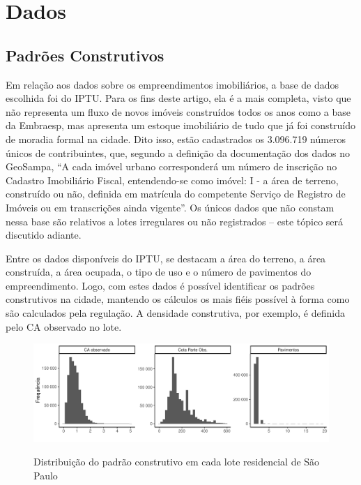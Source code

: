 \chapter{Dados}
\label{chp:dados}

\section{Padrões Construtivos}
\label{sec:dadosIPTU}

Em relação aos dados sobre os empreendimentos imobiliários, a base de dados escolhida foi do IPTU. Para os fins deste artigo, ela é a mais completa, visto que não representa um fluxo de novos imóveis construídos todos os anos como a base da Embraesp, mas apresenta um estoque imobiliário de tudo que já foi construído de moradia formal na cidade. Dito isso, estão cadastrados os 3.096.719 números únicos de contribuintes, que, segundo a definição da documentação dos dados no GeoSampa, ``A cada imóvel urbano corresponderá um número de inscrição no Cadastro Imobiliário Fiscal, entendendo-se como imóvel: I - a área de terreno, construído ou não, definida em matrícula do competente Serviço de Registro de Imóveis ou em transcrições ainda vigente''. Os únicos dados que não constam nessa base são relativos a lotes irregulares ou não registrados -- este tópico será discutido adiante.

Entre os dados disponíveis do IPTU, se destacam a área do terreno, a área construída, a área ocupada, o tipo de uso e o número de pavimentos do empreendimento. Logo, com estes dados é possível identificar os padrões construtivos na cidade, mantendo os cálculos os mais fiéis possível à forma como são calculados pela regulação. A densidade construtiva, por exemplo, é definida pelo CA observado no lote. 

\begin{figure}[h]
    \centering
    \caption{Distribuição do padrão construtivo em cada lote residencial de São Paulo}
    \includegraphics[width = \linewidth]{figuras/indicadores.pdf}
    \label{fig:histogramas}
\end{figure}

